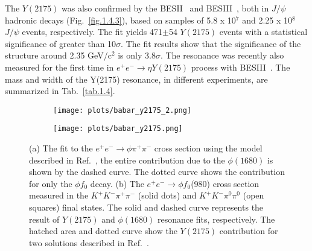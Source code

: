 The $Y(2175)$ was also confirmed by the BESII~\cite{Ablikim08} and BESIII~\cite{Ablikim15}, both in $J/\psi$ hadronic decays (Fig.~\ref{fig.1.4.3}), based on samples of 5.8 x 10$^7$ and 2.25 x 10$^8$ $J/\psi$ events, respectively. The fit yields 471$\pm$54 $Y(2175)$ events with a statistical significance of greater than 10$\sigma$. The fit results show that the significance of the structure around 2.35 GeV/c$^2$ is only 3.8$\sigma$. The resonance was recently also measured for the first time in $e^{+}e^{-}\rightarrow \eta Y(2175)$ process with BESIII~\cite{Ablikim19}. The mass and width of the Y(2175) resonance, in different experiments, are summarized in Tab.~\ref{tab.1.4}.

    \begin{figure}[H]
        \centering
        \begin{subfigure}[b]{0.45\textwidth}
            \texttt{[image: plots/babar\_y2175\_2.png]}
            \caption{}
            \label{fig.1.4.1.a}
        \end{subfigure}\hfill
        \begin{subfigure}[b]{0.45\textwidth}
            \texttt{[image: plots/babar\_y2175.png]}
            \caption{}
            \label{fig.1.4.1.b}
         \end{subfigure}
         \caption{(a) The fit to the $e^{+}e^{-}\rightarrow \phi \pi^{+} \pi^{-}$ cross section using the model described in Ref.~\cite{Aubert12}, the entire contribution due to the $\phi(1680)$ is shown by the dashed curve. The dotted curve shows the contribution for only the $\phi f_0$ decay. (b) The $e^+e^- \rightarrow \phi f_0$(980) cross section measured in the $K^{+}K^{-}\pi^{+}\pi^{-}$ (solid dots) and $K^{+}K^{-}\pi^{0}\pi^{0}$ (open squares) final states. The solid and dashed curve represents the result of $Y(2175)$ and $\phi(1680)$ resonance fits, respectively. The hatched area and dotted curve show the $Y(2175)$ contribution for two solutions described in Ref.~\cite{Aubert12}. }
        \label{fig.1.4.1}
    \end{figure}
    

